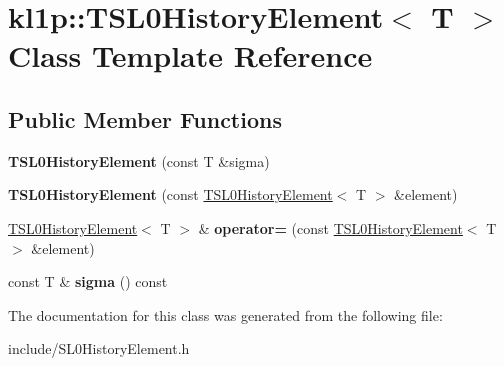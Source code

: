 \hypertarget{classkl1p_1_1TSL0HistoryElement}{}\section{kl1p\+:\+:T\+S\+L0\+History\+Element$<$ T $>$ Class Template Reference}
\label{classkl1p_1_1TSL0HistoryElement}
\subsection*{Public Member Functions}
\begin{DoxyCompactItemize}
\item 
{\bfseries T\+S\+L0\+History\+Element} (const T \&sigma)\hypertarget{classkl1p_1_1TSL0HistoryElement_a625678599d4164c48ab3c16a86eeec89}{}\label{classkl1p_1_1TSL0HistoryElement_a625678599d4164c48ab3c16a86eeec89}

\item 
{\bfseries T\+S\+L0\+History\+Element} (const \hyperlink{classkl1p_1_1TSL0HistoryElement}{T\+S\+L0\+History\+Element}$<$ T $>$ \&element)\hypertarget{classkl1p_1_1TSL0HistoryElement_a130bf8f410b582876a0563e2033cddd1}{}\label{classkl1p_1_1TSL0HistoryElement_a130bf8f410b582876a0563e2033cddd1}

\item 
\hyperlink{classkl1p_1_1TSL0HistoryElement}{T\+S\+L0\+History\+Element}$<$ T $>$ \& {\bfseries operator=} (const \hyperlink{classkl1p_1_1TSL0HistoryElement}{T\+S\+L0\+History\+Element}$<$ T $>$ \&element)\hypertarget{classkl1p_1_1TSL0HistoryElement_a0b04017bea59f975cd47da252d9be637}{}\label{classkl1p_1_1TSL0HistoryElement_a0b04017bea59f975cd47da252d9be637}

\item 
const T \& {\bfseries sigma} () const \hypertarget{classkl1p_1_1TSL0HistoryElement_a5814b863bd96a43c847d1eb3e63ea5fa}{}\label{classkl1p_1_1TSL0HistoryElement_a5814b863bd96a43c847d1eb3e63ea5fa}

\end{DoxyCompactItemize}


The documentation for this class was generated from the following file\+:\begin{DoxyCompactItemize}
\item 
include/S\+L0\+History\+Element.\+h\end{DoxyCompactItemize}
